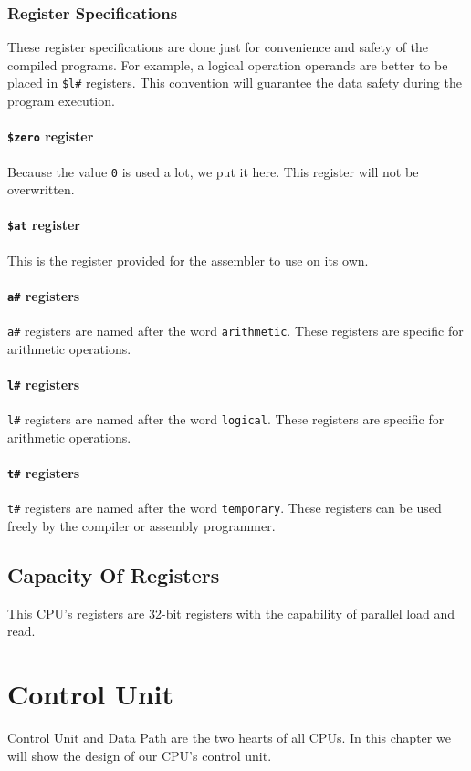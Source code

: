 \documentclass[12pt, dvipsnames, svgnames, x11names, oneside]{book}
\newenvironment{sansserif}{\sffamily}{\normalfont}
\begin{document}
		\subsection{Register Specifications}
		These register specifications are done just for convenience and safety of the compiled programs. For example, a logical operation operands are better to be placed in \texttt{\$l\#} registers. This convention will guarantee the data safety during the program execution.
		
		\subsubsection{\texttt{\$zero} register}
		Because the value \texttt{0} is used a lot, we put it here. This register will not be overwritten.
		\subsubsection{\texttt{\$at} register}
		This is the register provided for the assembler to use on its own.
		\subsubsection{\texttt{a\#} registers}
		\texttt{a\#} registers are named after the word \texttt{arithmetic}. These registers are specific for arithmetic operations.
		\subsubsection{\texttt{l\#} registers}
		\texttt{l\#} registers are named after the word \texttt{logical}. These registers are specific for arithmetic operations.
		
		\subsubsection{\texttt{t\#} registers}			
		\texttt{t\#} registers are named after the word \texttt{temporary}. These registers can be used freely by the compiler or assembly programmer.
		
		\section{Capacity Of Registers}\label{sec:cap-of-regs}
		This CPU's registers are 32-bit registers with the capability of parallel load and read.
		
		\chapter{Control Unit}
		\begin{sansserif}
			Control Unit and Data Path are the two hearts of all CPUs. In this chapter we will show the design of our CPU's control unit.
		\end{sansserif}
		
\end{document}
